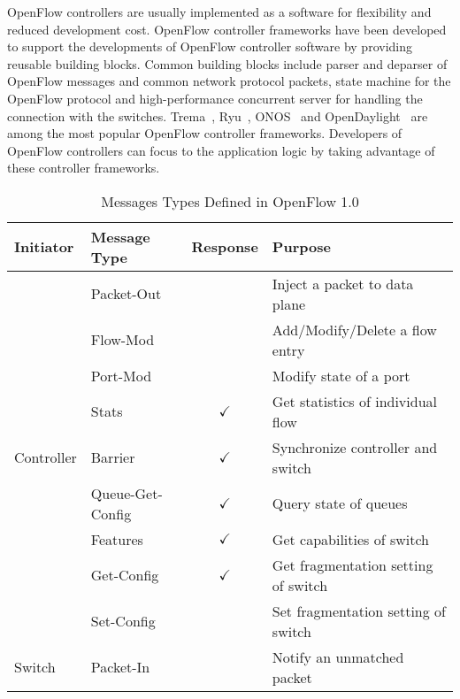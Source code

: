 OpenFlow controllers are usually implemented as a software for flexibility and
reduced development cost. OpenFlow controller frameworks have been developed
to support the developments of OpenFlow controller software by providing
reusable building blocks. Common building blocks include parser and deparser
of OpenFlow messages and common network protocol packets, state machine for
the OpenFlow protocol and high-performance concurrent server for handling the
connection with the switches. Trema~\autocite{trema}, Ryu~\autocite{Ryu2014},
ONOS~\autocite{Berde2014} and OpenDaylight~\autocite{Medved2014} are among the
most popular OpenFlow controller frameworks. Developers of OpenFlow
controllers can focus to the application logic by taking advantage of these
controller frameworks.

\begin{table}[t]
\centering
\caption{Messages Types Defined in OpenFlow 1.0}%
\label{tbl:openflow-messages}
\begin{tabular}{@{}llcl@{}}
\toprule
Initiator                   & Message Type     & Response     & Purpose                               \\ \midrule
\multirow{9}{*}{Controller} & Packet-Out       &              & Inject a packet to data plane         \\
                            & Flow-Mod         &              & Add/Modify/Delete a flow entry        \\
                            & Port-Mod         &              & Modify state of a port                \\
                            & Stats            & $\checkmark$ & Get statistics of individual flow     \\
                            & Barrier          & $\checkmark$ & Synchronize controller and switch     \\
                            & Queue-Get-Config & $\checkmark$ & Query state of queues                 \\
                            & Features         & $\checkmark$ & Get capabilities of switch            \\
                            & Get-Config       & $\checkmark$ & Get fragmentation setting of switch   \\
                            & Set-Config       &              & Set fragmentation setting of switch   \\ \midrule
\multirow{3}{*}{Switch}     & Packet-In        &              & Notify an unmatched packet            \\

\end{tabular}
\end{table}
